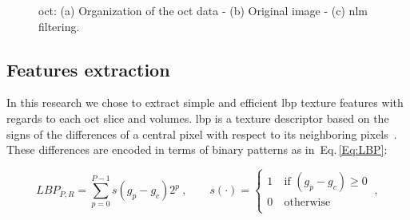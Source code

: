 \begin{figure}[t]
  \centering
  \hspace*{\fill}
   \hfill
   \hfill
  \hspace*{\fill}
  \caption{\ac{oct}: (a) Organization of the \ac{oct} data - (b) Original image - (c) \ac{nlm} filtering.}
  \label{fig:denoise}
\end{figure}

\subsection{Features extraction}\label{subsec:feaext}
{\color{red}In this research we chose to extract simple and efficient \ac{lbp} texture features with regards to each \ac{oct} slice and volumes.}
\ac{lbp} is a texture descriptor based on the signs of the differences of a central pixel with respect to its neighboring pixels~\cite{ojala2002multiresolution}. 
These differences are encoded in terms of binary patterns as in~Eq.\,\eqref{Eq:LBP}: 

\begin{equation}\label{Eq:LBP}
LBP_{P,R} = \sum_{p=0}^{P-1}s(g_{p} - g_{c})2^{p} \ , \qquad s(\cdot) = \begin{cases}
    1  & \ \text{if } (g_{p} - g_{c}) \geq 0\\
    0  & \ \text{otherwise}\\
  \end{cases} \ ,
\end{equation}

